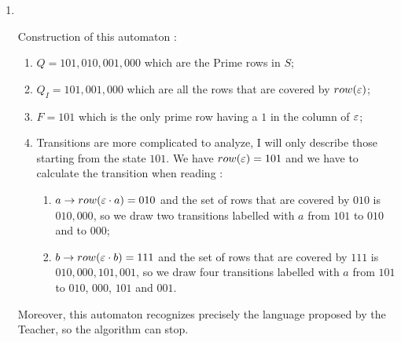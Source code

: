 \begin{enumerate}
  \item \begin{minipage}{0.3\textwidth}
          
        \end{minipage}\quad\\
        \begin{minipage}{1\textwidth}
          Construction of this automaton :
          \begin{enumerate}
            \item $Q = {101,010,001,000}$ which are the Prime rows in $S$;
            \item $Q_I = {101,001,000}$ which are all the rows that are covered by $row(\varepsilon)$;
            \item $F = {101}$ which is the only prime row having a $1$ in the column of $\varepsilon$;
            \item Transitions are more complicated to analyze, I will only describe those starting from the state $101$. We have $row(\varepsilon) = 101$ and we have to calculate the transition when reading :
                  \begin{enumerate}
                    \item $a \rightarrow row(\varepsilon \cdot a) = 010$ and the set of rows that are covered by $010$ is ${010, 000}$, so we draw two transitions labelled with $a$ from $101$ to $010$ and to $000$;
                    \item $b \rightarrow row(\varepsilon \cdot b) = 111$ and the set of rows that are covered by $111$ is ${010, 000, 101, 001}$, so we draw four transitions labelled with $a$ from $101$ to $010$, $000$, $101$ and $001$.
                  \end{enumerate}
          \end{enumerate}
          Moreover, this automaton recognizes precisely the language proposed by the Teacher, so the algorithm can stop.
        \end{minipage}
\end{enumerate}